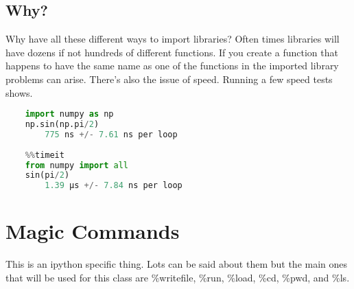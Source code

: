 \documentclass[12pt]{book}
\newcommand\tab[1][0.5cm]{\hspace*{#1}}
\begin{document}
\subsection{Why?}
\tab Why have all these different ways to import libraries? Often times libraries will have dozens if not hundreds of different functions. If you create a function that happens to have the same name as one of the functions in the imported library problems can arise. There's also the issue of speed. Running a few speed tests shows.
\begin{lstlisting}[language = Python]
	%%timeit
	import numpy as np
	np.sin(np.pi/2)
		775 ns +/- 7.61 ns per loop
	
	%%timeit
	from numpy import all
	sin(pi/2)
		1.39 µs +/- 7.84 ns per loop
\end{lstlisting}

\section{Magic Commands}
\tab This is an ipython specific thing. Lots can be said about them but the main ones that will be used for this class are \%writefile, \%run, \%load, \%cd, \%pwd, and \%ls.
\end{document}
